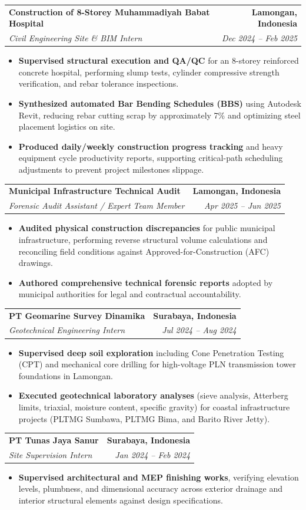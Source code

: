 \documentclass[letterpaper,10pt]{article}
\makeatletter
\newcommand{\resumeItem}[1]{
  \item\small{
    {#1 \vspace{-1.5pt}}
  }
}
\newcommand{\resumeSubheading}[4]{
  \vspace{-1pt}\item
    \begin{tabular*}{0.98\textwidth}[t]{l@{\extracolsep{\fill}}r}
      \textbf{#1} & \textbf{\small #2} \\
      \textit{\small#3} & \textit{\small #4} \\
    \end{tabular*}\vspace{-5pt}
}
\newcommand{\resumeItemListStart}{\begin{itemize}[leftmargin=0.15in]}
\newcommand{\resumeItemListEnd}{\end{itemize}\vspace{-3pt}}
\makeatother
\begin{document}
    \resumeSubheading
      {Construction of 8-Storey Muhammadiyah Babat Hospital}{Lamongan, Indonesia}
      {Civil Engineering Site \& BIM Intern}{Dec 2024 -- Feb 2025}
      \resumeItemListStart
        \resumeItem{\textbf{Supervised structural execution and QA/QC} for an 8-storey reinforced concrete hospital, performing slump tests, cylinder compressive strength verification, and rebar tolerance inspections.}
        \resumeItem{\textbf{Synthesized automated Bar Bending Schedules (BBS)} using Autodesk Revit, reducing rebar cutting scrap by approximately 7\% and optimizing steel placement logistics on site.}
        \resumeItem{\textbf{Produced daily/weekly construction progress tracking} and heavy equipment cycle productivity reports, supporting critical-path scheduling adjustments to prevent project milestones slippage.}
      \resumeItemListEnd

    \resumeSubheading
      {Municipal Infrastructure Technical Audit}{Lamongan, Indonesia}
      {Forensic Audit Assistant / Expert Team Member}{Apr 2025 -- Jun 2025}
      \resumeItemListStart
        \resumeItem{\textbf{Audited physical construction discrepancies} for public municipal infrastructure, performing reverse structural volume calculations and reconciling field conditions against Approved-for-Construction (AFC) drawings.}
        \resumeItem{\textbf{Authored comprehensive technical forensic reports} adopted by municipal authorities for legal and contractual accountability.}
      \resumeItemListEnd

    \resumeSubheading
      {PT Geomarine Survey Dinamika}{Surabaya, Indonesia}
      {Geotechnical Engineering Intern}{Jul 2024 -- Aug 2024}
      \resumeItemListStart
        \resumeItem{\textbf{Supervised deep soil exploration} including Cone Penetration Testing (CPT) and mechanical core drilling for high-voltage PLN transmission tower foundations in Lamongan.}
        \resumeItem{\textbf{Executed geotechnical laboratory analyses} (sieve analysis, Atterberg limits, triaxial, moisture content, specific gravity) for coastal infrastructure projects (PLTMG Sumbawa, PLTMG Bima, and Barito River Jetty).}
      \resumeItemListEnd

    \resumeSubheading
      {PT Tunas Jaya Sanur}{Surabaya, Indonesia}
      {Site Supervision Intern}{Jan 2024 -- Feb 2024}
      \resumeItemListStart
        \resumeItem{\textbf{Supervised architectural and MEP finishing works}, verifying elevation levels, plumbness, and dimensional accuracy across exterior drainage and interior structural elements against design specifications.}
      \resumeItemListEnd
\end{document}
